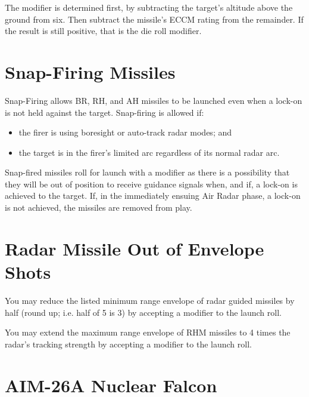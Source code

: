 The modifier is determined first, by subtracting the target's altitude above the ground from six. Then subtract the missile's ECCM rating from the remainder. If the result is still positive, that is the die roll modifier.


\begin{advancedrules}

    \section{Snap-Firing Missiles}
    \label{rule:snap-firing-missiles}

    Snap-Firing allows BR, RH, and AH missiles to be launched even when a lock-on is not held against the target. Snap-firing is allowed if:

    \begin{itemize}
        \item the firer is using boresight or auto-track radar modes; and
        \item the target is in the firer's limited arc regardless of its normal radar arc.
    \end{itemize}

    Snap-fired missiles roll for launch with a  modifier as there is a possibility that they will be out of position to receive guidance signals when, and if, a lock-on is achieved to the target. If, in the immediately ensuing Air Radar phase, a lock-on is not achieved, the missiles are removed from play.

    \section{Radar Missile Out of Envelope Shots}
    \label{rule:radar-out-of-envelope-launches}

    You may reduce the listed minimum range envelope of radar guided missiles by half (round up; i.e. half of 5 is 3) by accepting a  modifier to the launch roll.

    You may extend the maximum range envelope of RHM missiles to 4 times the radar's tracking strength by accepting a  modifier to the launch roll.

    \section{AIM-26A Nuclear Falcon}


\end{advancedrules}
